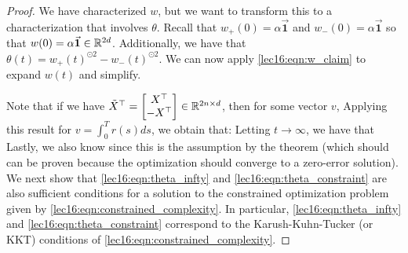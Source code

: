 \begin{proof}
We have characterized $w$, but we want to transform this to a characterization that involves $\theta$.
Recall that $w_+(0) = \alpha \vec{\mathbf{1}}$ and $w_-(0) = \alpha \vec{\mathbf{1}}$ so that $w(0) = \alpha \vec{\mathbf{1}} \in \mathbb R^{2d}$. Additionally, we have that $\theta(t) = w_+(t)^{\odot 2} - w_-(t)^{\odot 2} $.
We can now apply \eqref{lec16:eqn:w_claim} to expand $w(t)$ and simplify. 

Note that if we have $\tilde{X}^\top = \begin{bmatrix} X^\top \\ -X^\top \end{bmatrix} \in \mathbb R^{2n\times d}$, then for some vector $v$,
Applying this result for $v = \int_0^T r(s) ds$, we obtain that:
Letting $t \to \infty$, we have that
Lastly, we also know 
 since this is the assumption by the theorem (which should can be proven because the optimization should converge to a zero-error solution). We next show that \eqref{lec16:eqn:theta_infty} and \eqref{lec16:eqn:theta_constraint} are also sufficient conditions for a solution to the constrained optimization problem given by \eqref{lec16:eqn:constrained_complexity}. In particular, \eqref{lec16:eqn:theta_infty} and \eqref{lec16:eqn:theta_constraint} correspond to the Karush-Kuhn-Tucker (or KKT) conditions of \eqref{lec16:eqn:constrained_complexity}.


\end{proof}
